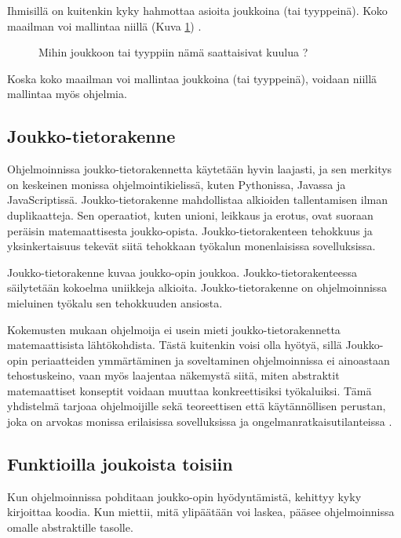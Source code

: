 Ihmisillä on kuitenkin kyky hahmottaa asioita joukkoina (tai tyyppeinä). Koko maailman voi mallintaa niillä (Kuva \ref{fig:fruit_set}) \cite{algebraic_data_types}.


\begin{figure}[ht]
    \centering
    \caption{Mihin joukkoon tai tyyppiin nämä saattaisivat kuulua \cite{viljofruits}?}
    \label{fig:fruit_set}
\end{figure}

Koska koko maailman voi mallintaa joukkoina (tai tyyppeinä), voidaan niillä mallintaa myös ohjelmia.




\subsection{Joukko-tietorakenne}

Ohjelmoinnissa joukko-tietorakennetta käytetään hyvin laajasti, ja sen merkitys on keskeinen monissa ohjelmointikielissä, kuten Pythonissa, Javassa ja JavaScriptissä. Joukko-tietorakenne mahdollistaa alkioiden tallentamisen ilman duplikaatteja. Sen operaatiot, kuten unioni, leikkaus ja erotus, ovat suoraan peräisin matemaattisesta joukko-opista. Joukko-tietorakenteen tehokkuus ja yksinkertaisuus tekevät siitä tehokkaan työkalun monenlaisissa sovelluksissa. \citep{mdn_set,ecma_spec}

Joukko-tietorakenne kuvaa joukko-opin joukkoa. Joukko-tietorakenteessa säilytetään kokoelma uniikkeja alkioita. Joukko-tietorakenne on ohjelmoinnissa mieluinen työkalu sen tehokkuuden ansiosta. \citep{ecma_spec}

Kokemusten mukaan ohjelmoija ei usein mieti joukko-tietorakennetta matemaattisista lähtökohdista. Tästä kuitenkin voisi olla hyötyä, sillä Joukko-opin periaatteiden ymmärtäminen ja soveltaminen ohjelmoinnissa ei ainoastaan tehostuskeino, vaan myös laajentaa näkemystä siitä, miten abstraktit matemaattiset konseptit voidaan muuttaa konkreettisiksi työkaluiksi. Tämä yhdistelmä tarjoaa ohjelmoijille sekä teoreettisen että käytännöllisen perustan, joka on arvokas monissa erilaisissa sovelluksissa ja ongelmanratkaisutilanteissa \cite{bartosz_category_for_progamers}.

\subsection{Funktioilla joukoista toisiin}
Kun ohjelmoinnissa pohditaan joukko-opin hyödyntämistä, kehittyy  kyky kirjoittaa koodia. Kun miettii, mitä ylipäätään voi laskea, pääsee ohjelmoinnissa omalle abstraktille tasolle. \citep{Tan2004,BlellochHarper2015}

